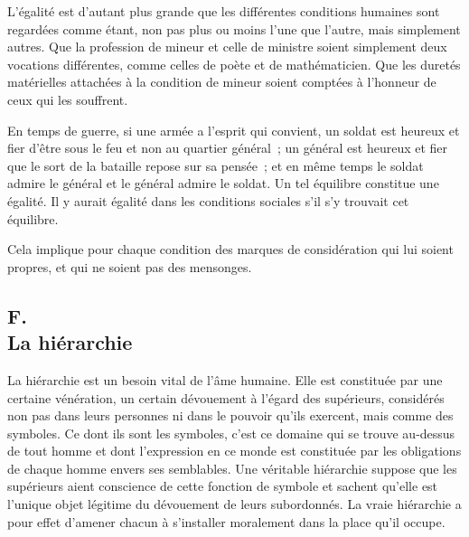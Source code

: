 \documentclass[french,twoside]{book} %
\begin{document}
L'égalité est d'autant plus grande que les différentes conditions humaines sont regardées comme étant, non pas plus ou moins l'une que l'autre, mais simplement autres. Que la profession de mineur et celle de ministre soient simplement deux vocations différentes, comme celles de poète et de mathématicien. Que les duretés matérielles attachées à la condition de mineur soient comptées à l'honneur de ceux qui les souffrent.\par
En temps de guerre, si une armée a l'esprit qui convient, un soldat est heureux et fier d'être sous le feu et non au quartier général ; un général est heureux et fier que le sort de la bataille repose sur sa pensée ; et en même temps le soldat admire le général et le général admire le soldat. Un tel équilibre constitue une égalité. Il y aurait égalité dans les conditions sociales s'il s'y trouvait cet équilibre.\par
Cela implique pour chaque condition des marques de considération qui lui soient propres, et qui ne soient pas des mensonges.
\subsection[F. La hiérarchie]{F. \\
La hiérarchie}
\noindent \par
La hiérarchie est un besoin vital de l'âme humaine. Elle est constituée par une certaine vénération, un certain dévouement à l'égard des supérieurs, considérés non pas dans leurs personnes ni dans le pouvoir qu'ils exercent, mais comme des symboles. Ce dont ils sont les symboles, c'est ce domaine qui se trouve au-dessus de tout homme et dont l'expression en ce monde est constituée par les obligations de chaque homme envers ses semblables. Une véritable hiérarchie suppose que les supérieurs aient conscience de cette fonction de symbole et sachent qu'elle est l'unique objet légitime du dévouement de leurs subordonnés. La vraie hiérarchie a pour effet d'amener chacun à s'installer moralement dans la place qu'il occupe.
\end{document}
